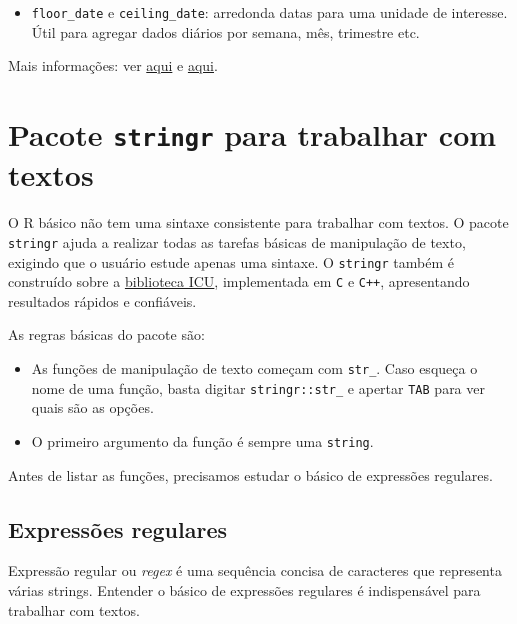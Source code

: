 \documentclass[]{book}
\providecommand{\tightlist}{%
  \setlength{\itemsep}{0pt}\setlength{\parskip}{0pt}}
\begin{document}
\begin{itemize}
\tightlist
\item
  \texttt{floor\_date} e \texttt{ceiling\_date}: arredonda datas para
  uma unidade de interesse. Útil para agregar dados diários por semana,
  mês, trimestre etc.
\end{itemize}

Mais informações: ver
\href{https://cran.r-project.org/web/packages/lubridate/vignettes/lubridate.html}{aqui}
e
\href{https://www.jstatsoft.org/index.php/jss/article/view/v040i03/v40i03.pdf}{aqui}.

\section{\texorpdfstring{Pacote \texttt{stringr} para trabalhar com
textos}{Pacote stringr para trabalhar com textos}}\label{pacote-stringr-para-trabalhar-com-textos}

O R básico não tem uma sintaxe consistente para trabalhar com textos. O
pacote \texttt{stringr} ajuda a realizar todas as tarefas básicas de
manipulação de texto, exigindo que o usuário estude apenas uma sintaxe.
O \texttt{stringr} também é construído sobre a
\href{http://site.icu-project.org/}{biblioteca ICU}, implementada em
\texttt{C} e \texttt{C++}, apresentando resultados rápidos e confiáveis.

As regras básicas do pacote são:

\begin{itemize}
\tightlist
\item
  As funções de manipulação de texto começam com \texttt{str\_}. Caso
  esqueça o nome de uma função, basta digitar \texttt{stringr::str\_} e
  apertar \texttt{TAB} para ver quais são as opções.
\item
  O primeiro argumento da função é sempre uma \texttt{string}.
\end{itemize}

Antes de listar as funções, precisamos estudar o básico de expressões
regulares.

\subsection{Expressões regulares}\label{expressoes-regulares}

Expressão regular ou \emph{regex} é uma sequência concisa de caracteres
que representa várias strings. Entender o básico de expressões regulares
é indispensável para trabalhar com textos.
\end{document}

